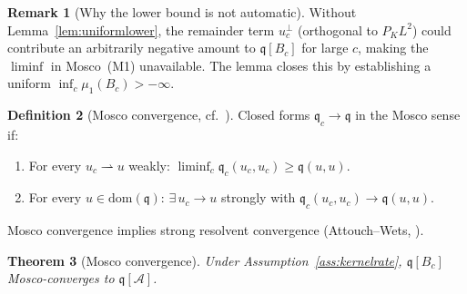 \documentclass[12pt,a4paper]{amsart}
\newtheorem{theorem}{Theorem}[section]
\theoremstyle{definition}
\newtheorem{definition}[theorem]{Definition}
\newtheorem{remark}[theorem]{Remark}
\newcommand{\cA}{\mathcal{A}}
\begin{document}
\begin{remark}[Why the lower bound is not automatic]
\label{rem:lowerbd}
Without Lemma~\ref{lem:uniformlower}, the remainder term
$u_c^\perp$ (orthogonal to $P_K L^2$) could contribute
an arbitrarily negative amount to $\mathfrak{q}[B_c]$
for large $c$, making the $\liminf$ in Mosco~(M1)
unavailable.
The lemma closes this by establishing a uniform
$\inf_c\mu_1(B_c) > -\infty$.
\end{remark}

\begin{definition}[Mosco convergence, cf.~\cite{Mosco1969,Attouch1984}]
\label{def:mosco}
Closed forms $\mathfrak{q}_c\to\mathfrak{q}$ in the Mosco sense if:
\begin{enumerate}[nosep,label=(M\arabic*)]
  \item For every $u_c\rightharpoonup u$ weakly:
    $\liminf_c\mathfrak{q}_c(u_c,u_c)\geq\mathfrak{q}(u,u)$.
  \item For every $u\in\mathrm{dom}(\mathfrak{q})$:
    $\exists\,u_c\to u$ strongly with
    $\mathfrak{q}_c(u_c,u_c)\to\mathfrak{q}(u,u)$.
\end{enumerate}
Mosco convergence implies strong resolvent convergence
(Attouch--Wets, \cite{Attouch1984}).
\end{definition}

\begin{theorem}[Mosco convergence]
\label{thm:mosco}
Under Assumption~\ref{ass:kernelrate},
$\mathfrak{q}[B_c]$ Mosco-converges to $\mathfrak{q}[\cA]$.
\end{theorem}
\end{document}
